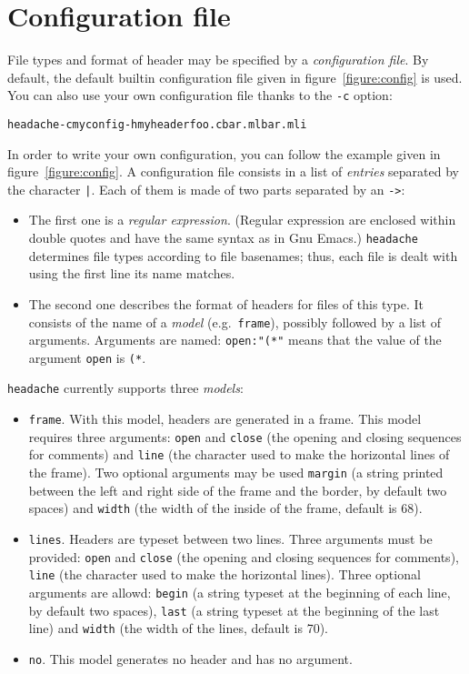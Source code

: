 \documentclass{article}
\newcommand{\headache}{\texttt{headache}}
\begin{document}
\section{Configuration file}

File types and format of header may be specified by a
\emph{configuration file}.  By default, the default builtin
configuration file given in figure~\ref{figure:config} is used.  You
can also use your own configuration file thanks to the \verb+-c+
option:
\begin{alltt}
  headache -c myconfig -h myheader foo.c bar.ml bar.mli
\end{alltt}

In order to write your own configuration, you can follow the example
given in figure~\ref{figure:config}.  A configuration file consists in
a list of \emph{entries} separated by the character \verb+|+.  Each
of them is made of two parts separated by an \verb+->+:
\begin{itemize}
\item The first one is a \emph{regular expression}.  (Regular
  expression are enclosed within double quotes and have the same
  syntax as in Gnu Emacs.)  \headache{} determines file types according to
  file basenames; thus, each file is dealt with using the first line
  its name matches.
\item The second one describes the format of headers for files of this
  type.  It consists of the name of a \emph{model} (e.g.\ 
  \verb+frame+), possibly followed by a list of arguments.  Arguments
  are named: \verb+open:"(*"+ means that the value of the argument
  \verb+open+ is \verb+(*+.
\end{itemize}
\headache{} currently supports three \emph{models}:
\begin{itemize}
\item \verb+frame+.  With this model, headers are generated in a
  frame.  This model requires three arguments: \verb+open+ and
  \verb+close+ (the opening and closing sequences for comments) and
  \verb+line+ (the character used to make the horizontal lines of the
  frame).  Two optional arguments may be used \verb+margin+ (a string
  printed between the left and right side of the frame and the border,
  by default two spaces) and \verb+width+ (the width of the inside of
  the frame, default is 68).
\item \verb+lines+.  Headers are typeset between two lines.  Three
  arguments must be provided: \verb+open+ and \verb+close+ (the
  opening and closing sequences for comments), \verb+line+ (the
  character used to make the horizontal lines).  Three optional
  arguments are allowd: \verb+begin+ (a string typeset at the
  beginning of each line, by default two spaces), \verb+last+ (a
  string typeset at the beginning of the last line) and \verb+width+
  (the width of the lines, default is 70).
\item \verb+no+.  This model generates no header and has no argument.
\end{itemize}
\end{document}
